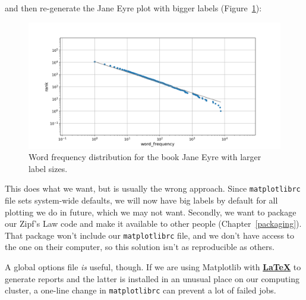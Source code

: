 \documentclass[
]{krantz}
\makeatletter
\newenvironment{Shaded}{\begin{snugshade}}{\end{snugshade}}
\newcommand{\BuiltInTok}[1]{#1}
\newcommand{\NormalTok}[1]{#1}
\newcommand{\OperatorTok}[1]{\textcolor[rgb]{0.81,0.36,0.00}{\textbf{#1}}}
\newenvironment{kframe}{%
\medskip{}
\setlength{\fboxsep}{.8em}
 \def\at@end@of@kframe{}%
 \ifinner\ifhmode%
  \def\at@end@of@kframe{\end{minipage}}%
  \begin{minipage}{\columnwidth}%
 \fi\fi%
 \def\FrameCommand##1{\hskip\@totalleftmargin \hskip-\fboxsep
 \colorbox{shadecolor}{##1}\hskip-\fboxsep
     \hskip-\linewidth \hskip-\@totalleftmargin \hskip\columnwidth}%
 \MakeFramed {\advance\hsize-\width
   \@totalleftmargin\z@ \linewidth\hsize
   \@setminipage}}%
 {\par\unskip\endMakeFramed%
 \at@end@of@kframe}
\renewenvironment{Shaded}{\begin{kframe}}{\end{kframe}}
\newcommand{\gref}[2]{\hyperlink{#2}{\textbf{#1}}}
\makeatother
\begin{document}
and then re-generate the Jane Eyre plot with bigger labels
(Figure~\ref{fig:configuration-jane-eyre-big-labels}):

\begin{Shaded}
\end{Shaded}

\begin{figure}

{\centering \includegraphics[width=1\linewidth]{figures/config/jane-eyre-big-labels} 

}

\caption{Word frequency distribution for the book Jane Eyre with larger label sizes.}\label{fig:configuration-jane-eyre-big-labels}
\end{figure}

This does what we want,
but is usually the wrong approach.
Since \texttt{matplotlibrc} file sets system-wide defaults,
we will now have big labels by default for all plotting we do in future,
which we may not want.
Secondly,
we want to package our Zipf's Law code and make it available to other people (Chapter~\ref{packaging}).
That package won't include our \texttt{matplotlibrc} file,
and we don't have access to the one on their computer,
so this solution isn't as reproducible as others.

A global options file \emph{is} useful, though.
If we are using Matplotlib with \gref{LaTeX}{latex} to generate reports
and the latter is installed in an unusual place on our computing cluster,
a one-line change in \texttt{matplotlibrc} can prevent a lot of failed jobs.
\end{document}
